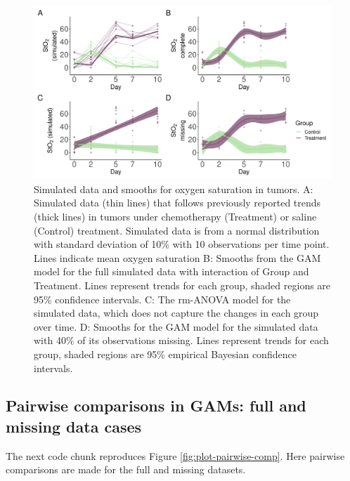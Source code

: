 \documentclass[
]{article}
\begin{document}
\begin{figure}

{\centering \includegraphics[width=1\linewidth]{SIM_Appendix_files/figure-latex/sim-smooth-plot-Appendix-1} 

}

\caption{Simulated data and smooths for oxygen saturation in tumors. A: Simulated data (thin lines) that follows previously reported trends (thick lines) in tumors under chemotherapy (Treatment) or saline (Control) treatment. Simulated data is from a normal distribution with standard deviation of 10\% with 10 observations per time point. Lines indicate mean oxygen saturation B: Smooths from the GAM model for the full simulated data with interaction of Group and Treatment. Lines represent trends for each group, shaded regions are 95\% confidence intervals. C: The rm-ANOVA model for the simulated data, which does not capture the changes in each group over time. D: Smooths for the GAM model for the simulated data with 40\% of its observations missing. Lines represent trends for each group, shaded regions are 95\% empirical Bayesian confidence intervals.}\label{fig:sim-smooth-plot-Appendix}
\end{figure}

\hypertarget{pairwise-comparisons-in-gams-full-and-missing-data-cases}{%
\subsection{Pairwise comparisons in GAMs: full and missing data cases}\label{pairwise-comparisons-in-gams-full-and-missing-data-cases}}

The next code chunk reproduces Figure \ref{fig:plot-pairwise-comp}. Here pairwise comparisons are made for the full and missing datasets.
\end{document}

